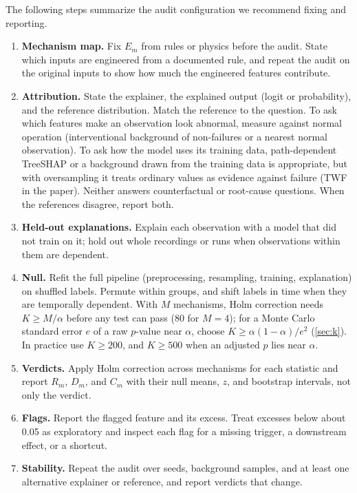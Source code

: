 \documentclass[10pt]{article}
\begin{document}
The following steps summarize the audit configuration we recommend fixing and reporting.
\begin{enumerate}
\item \textbf{Mechanism map.} Fix $E_m$ from rules or physics before the audit. State which inputs are engineered from a documented rule, and repeat the audit on the original inputs to show how much the engineered features contribute.
\item \textbf{Attribution.} State the explainer, the explained output (logit or probability), and the reference distribution. Match the reference to the question. To ask which features make an observation look abnormal, measure against normal operation (interventional background of non-failures or a nearest normal observation). To ask how the model uses its training data, path-dependent TreeSHAP or a background drawn from the training data is appropriate, but with oversampling it treats ordinary values as evidence against failure (TWF in the paper). Neither answers counterfactual or root-cause questions. When the references disagree, report both.
\item \textbf{Held-out explanations.} Explain each observation with a model that did not train on it; hold out whole recordings or runs when observations within them are dependent.
\item \textbf{Null.} Refit the full pipeline (preprocessing, resampling, training, explanation) on shuffled labels. Permute within groups, and shift labels in time when they are temporally dependent. With $M$ mechanisms, Holm correction needs $K\geq M/\alpha$ before any test can pass (80 for $M=4$); for a Monte Carlo standard error $e$ of a raw $p$-value near $\alpha$, choose $K\geq\alpha(1-\alpha)/e^2$ (\cref{sec:k}). In practice use $K\geq200$, and $K\geq500$ when an adjusted $p$ lies near $\alpha$.
\item \textbf{Verdicts.} Apply Holm correction across mechanisms for each statistic and report $R_m$, $D_m$, and $C_m$ with their null means, $z$, and bootstrap intervals, not only the verdict.
\item \textbf{Flags.} Report the flagged feature and its excess. Treat excesses below about 0.05 as exploratory and inspect each flag for a missing trigger, a downstream effect, or a shortcut.
\item \textbf{Stability.} Repeat the audit over seeds, background samples, and at least one alternative explainer or reference, and report verdicts that change.
\end{enumerate}
\end{document}
